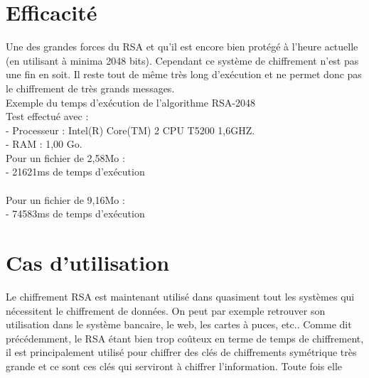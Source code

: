 		
	\section{Efficacité}
		Une des grandes forces du RSA et qu'il est encore bien protégé à l'heure actuelle (en utilisant à minima 2048 bits). Cependant ce système de chiffrement n'est pas une fin en soit. Il reste tout de même très long d'exécution et ne permet donc pas le chiffrement de très grands messages.\\
		
		Exemple du temps d'exécution de l'algorithme RSA-2048\\
			Test effectué avec :\\
			- Processeur : Intel(R) Core(TM) 2 CPU T5200 1,6GHZ.\\
			- RAM : 1,00 Go.\\
			
			Pour un fichier de 2,58Mo :\\
				- 21621ms de temps d'exécution\\\\ 
			Pour un fichier de 9,16Mo :\\
				- 74583ms de temps d'exécution\\
				
		
	\section{Cas d'utilisation}
		Le chiffrement RSA est maintenant utilisé dans quasiment tout les systèmes qui nécessitent le chiffrement de données. On peut par exemple retrouver son utilisation dans le système bancaire, le web, les cartes à puces, etc..
		Comme dit précédemment, le RSA étant bien trop coûteux en terme de temps de chiffrement, il est principalement utilisé pour chiffrer des clés de chiffrements symétrique très grande et ce sont ces clés qui serviront à chiffrer l'information. Toute fois elle